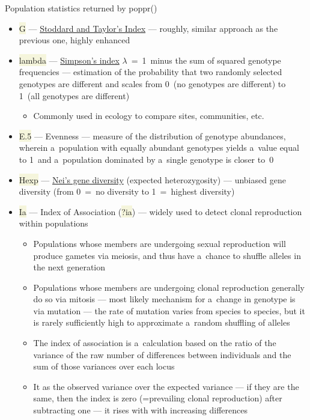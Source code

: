 \documentclass[compress, xelatex, 11pt, xcolor=svgnames, aspectratio=169, url={hyphens, lowtilde}]{beamer}
\renewcommand{\texttt}[1]{\colorbox{Beige}{{\ttfamily #1}}}
\begin{document}
\begin{frame}[allowframebreaks]{Population statistics returned by poppr()}
\begin{itemize}
		\begin{itemize}
			\item One of the most common diversity indices (used elsewhere, not only in biology)
		\end{itemize}
		\item \texttt{G} --- \href{https://doi.org/10.1093/genetics/118.4.705}{Stoddard and Taylor's Index} --- roughly, similar approach as the previous one, highly enhanced
		\item \texttt{lambda} --- \href{https://en.wikipedia.org/wiki/Diversity_index\#Simpson_index}{Simpson's index} $\lambda$~=~1~minus the sum of squared genotype frequencies --- estimation of the probability that two randomly selected genotypes are different and scales from 0~(no genotypes are different) to 1~(all genotypes are different)
		\begin{itemize}
			\item Commonly used in ecology to compare sites, communities, etc.
		\end{itemize}
		\item \texttt{E.5} --- Evenness --- measure of the distribution of genotype abundances, wherein a~population with equally abundant genotypes yields a~value equal to 1~and a~population dominated by a~single genotype is closer to~0
		\item \texttt{Hexp} --- \href{https://doi.org/10.1093/genetics/89.3.583}{Nei's gene diversity} (expected heterozygosity) --- unbiased gene diversity (from 0~=~no diversity to 1~=~highest diversity)
		\item \texttt{Ia} --- Index of Association (\texttt{?ia}) --- widely used to detect clonal reproduction within populations
		\begin{itemize}
			\item Populations whose members are undergoing sexual reproduction will produce gametes via meiosis, and thus have a~chance to shuffle alleles in the next generation
			\item Populations whose members are undergoing clonal reproduction generally do so via mitosis --- most likely mechanism for a~change in genotype is via mutation --- the rate of mutation varies from species to species, but it is rarely sufficiently high to approximate a~random shuffling of alleles
			\item The index of association is a~calculation based on the ratio of the variance of the raw number of differences between individuals and the sum of those variances over each locus
			\item It as the observed variance over the expected variance --- if they are the same, then the index is zero (=prevailing clonal reproduction) after subtracting one --- it rises with with increasing differences

\end{itemize}
\end{itemize}
\end{frame}
\end{document}
